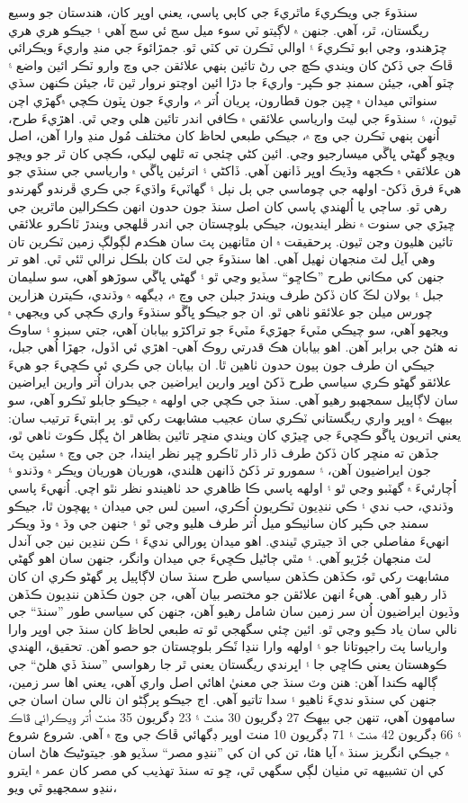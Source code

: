 \documentclass[a4paper]{article}
\begin{document}
سنڌوءَ جي ويڪريءَ ماٿريءَ جي کاٻي پاسي، يعني اوڀر کان، هندستان جو وسيع ريگستان، ٿر، آهي. جنهن ۾ لاڳيتو ٽي سوء ميل سڃ ئي سڃ آهي ۽ جيڪو هري هري چڙهندو، وڃي ابو ٽڪريءَ ۽ اوالي ٽڪرن تي کٽي ٿو. جمڙائوءَ جي منڍ واريءَ ويڪرائي ڦاڪ جي ڏکڻ کان ويندي ڪڇ جي رڻ تائين ٻنهي علائقن جي وچ وارو ٽڪر ائين واضع ۽ چٽو آهي، جيئن سمنڊ جو ڪپر- واريءَ جا دڙا ائين اوچتو نروار ٿين ٿا، جيئن ڪنهن سڌي سنواٽي ميدان ۾ ڇپن جون قطارون، پريان اُتر ۾، واريءَ جون ڀٽون ڪچي ۾گهڙي اچن ٿيون، ۽ سنڌوءَ جي ليٽ وارياسي علائقي ۾ ڪافي اندر تائين هلي وڃي ٿي. اهڙيءَ طرح، اُنهن ٻنهي ٽڪرن جي وچ ۾، جيڪي طبعي لحاظ کان مختلف مُول منڍ وارا آهن، اصل ويڇو گهڻي ڀاڱي ميسارجيو وڃي. ائين کڻي چئجي ته ٿلهي ليکي، ڪچي کان ٿر جو ويڇو هن علائقي ۾ ڪجهه وڌيڪ اوڀر ڏانهن آهي. ڏاکڻي ۽ اترئين ڀاڱي ۾ وارياسي جي سنڌي جو هيءَ فرق ڏکڻ- اولهه جي چوماسي جي ٻل نٻل ۽ گهاٽيءَ واڌيءَ جي ڪري ڦرندو گهرندو رهي ٿو. ساڄي يا اُلهندي پاسي کان اصل سنڌ جون حدون انهن ڪڪرالين ماٿرين جي ڇيڙي جي سنوت ۾ نظر اينديون، جيڪي بلوچستان جي اندر ڦلهجي ويندڙ ٽاڪرو علائقي تائين هليون وڃن ٿيون. پرحقيقت ۾ ان مٿانهين پٽ سان هڪدم لڳولڳ زمين ٽڪرين تان وهي آيل لٽ منجهان ٺهيل آهي. اها سنڌوءَ جي لٽ کان بلڪل نرالي ٿئي ٿي. اهو تر جنهن کي مڪاني طرح ”ڪاڇو“ سڏيو وڃي ٿو ۽ گهڻي ڀاڱي سوڙهو آهي، سو سليمان جبل ۽ بولان لڪَ کان ڏکڻ طرف ويندڙ جبلن جي وچ ۾، ڊيگهه ۾ وڌندي، ڪيترن هزارين چورس ميلن جو علائقو ٺاهي ٿو. ان جو جيڪو ڀاڱو سنڌوءَ واري ڪچي کي ويجهي ۾ ويجهو آهي، سو چيڪي مٽيءَ جهڙيءَ مٽيءَ جو تراکڙو بيابان آهي، جتي سبزو ۽ ساوڪ نه هئڻ جي برابر آهن. اهو بيابان هڪ قدرتي روڪ آهي- اهڙي ئي اڏول، جهڙا اُهي جبل، جيڪي ان طرف جون ٻيون حدون ٺاهين ٿا. ان بيابان جي ڪري ئي ڪڇيءَ جو هيءَ علائقو گهڻو ڪري سياسي طرح ڏکڻ اوڀر وارين ايراضين جي بدران اُتر وارين ايراضين سان لاڳاپيل سمجهبو رهيو آهي. سنڌ جي ڪچي جي اولهه ۾ جيڪو جابلو ٽڪرو آهي، سو بيهڪ ۾ اوڀر واري ريگستاني ٽڪري سان عجيب مشابهت رکي ٿو. پر ابتيءَ ترتيب سان: يعني اتريون ڀاڱو ڪڇيءَ جي ڇيڙي کان ويندي منڇر تائين بظاهر اڻ ڀڳل ڪوٽ ٺاهي ٿو، جڏهن ته منڇر کان ڏکڻ طرف ڌار ڌار ٽاڪرو ڇپر نظر ايندا، جن جي وچ ۾ سئين پٽ جون ايراضيون آهن، ۽ سمورو تر ڏکڻ ڏانهن هلندي، هوريان هوريان ويڪر ۾ وڌندو ۽ اُچارئيءَ ۾ گهٽبو وڃي ٿو ۽ اولهه پاسي ڪا ظاهري حد ٺاهيندو نظر نٿو اچي. اُنهيءَ پاسي وڌندي، حب ندي ۽ ڪي ننڍيون ٽڪريون اُڪري، اسين لس جي ميدان ۾ پهچون ٿا، جيڪو سمنڊ جي ڪپر کان ساٺيڪو ميل اُتر طرف هليو وڃي ٿو ۽ جنهن جي وڌ ۾ وڌ ويڪر انهيءَ مفاصلي جي اڌ جيتري ٿيندي. اهو ميدان پورالي نديءَ ۽ ڪن ننڍين نين جي آندل لٽ منجهان جُڙيو آهي. ۽ مٿي ڄاڻيل ڪڇيءَ جي ميدان وانگر، جنهن سان اهو گهڻي مشابهت رکي ٿو، ڪڏهن ڪڏهن سياسي طرح سنڌ سان لاڳاپيل پر گهڻو ڪري ان کان ڌار رهيو آهي. هيءُ انهن علائقن جو مختصر بيان آهي، جن جون ڪڏهن ننڍيون ڪڏهن وڏيون ايراضيون اُن سر زمين سان شامل رهيو آهن، جنهن کي سياسي طور ”سنڌ“ جي نالي سان ياد ڪيو وڃي ٿو. ائين چئي سگهجي ٿو ته طبعي لحاظ کان سنڌ جي اوڀر وارا وارياسا پٽ راجپوتانا جو ۽ اولهه وارا ننڍا ٽَڪر بلوچستان جو حصو آهن. تحقيق، الهندي ڪوهستان يعني ڪاڇي جا ۽ اڀرندي ريگستان يعني ٿر جا رهواسي ”سنڌ ڏي هلڻ“ جي ڳالهه ڪندا آهن: هنن وٽ سنڌ جي معنيٰ اهائي اصل واري آهي، يعني اها سر زمين، جنهن کي سنڌو نديءَ ٺاهيو ۽ سدا تاتيو آهي. اڄ جيڪو پرڳڻو ان نالي سان اسان جي سامهون آهي، تنهن جي بيهڪ 27 ڊگريون 30 منٽ ۽ 23 ڊگريون 35 منٽ اُتر ويڪرائي ڦاڪ ۽ 66 ڊگريون 42 منٽ ۽ 71 ڊگريون 10 منٽ اوڀر ڊگهائي ڦاڪ جي وچ ۾ آهي. شروع شروع ۾ جيڪي انگريز سنڌ ۾ آيا هئا، تن کي ان کي ”ننڍو مصر“ سڏيو هو. جيتوڻيڪ هاڻ اسان کي ان تشبيهه تي مٺيان لڳي سگهي ٿي، ڇو ته سنڌ تهذيب کي مصر کان عمر ۾ ايترو ننڍو سمجهيو ٿي ويو، 
\end{document}
